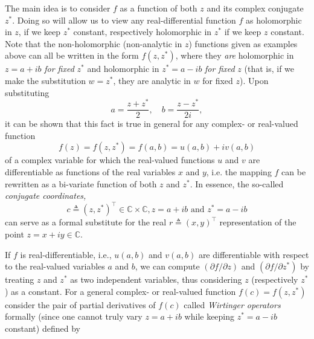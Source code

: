 \documentclass[11pt]{article}
\begin{document}
The main idea is to consider $f$ as a function of both $z$ and its complex conjugate $z^*$. Doing so will allow us to view any real-differential function $f$ as holomorphic in $z$, if we keep $z^* $ constant, respectively holomorphic in $z^*$ if we keep $z$  constant. Note that the non-holomorphic (non-analytic in $z$) functions given as examples above can  all be written in the form $f(z, z^*)$, where they \textit{are} holomorphic in $z=a+ib$ \textit{for fixed} $z^*$ and holomorphic in $z^*= a-ib$ \textit{for fixed} $z$ (that is, if we make the substitution $w=z^*$, they are analytic in $w$ for fixed $z$). Upon substituting
\begin{equation}
a = \frac{z+z^*}{2}, \quad b=\frac{z-z^*}{2i},
\end{equation}
it can be shown that this fact is true in general for any complex- or real-valued function
$$f(z) =f(z, z^*) = f(a,b) = u(a,b) + iv(a,b)$$
of a complex variable for which the real-valued functions $u$ and $v$ are differentiable as functions of the real variables $x$ and $y$, i.e. the mapping $f$ can be rewritten as a bi-variate function of both $z$ and $z^*$. In essence, the so-called \textit{conjugate coordinates,}
\begin{equation}
c \triangleq (z, z^*)^\top\in\mathbb C\times \mathbb C, z=a+ib\text{   and  } z^*= a-ib
\end{equation}
can serve as a formal substitute for the real  $r\triangleq (x,y)^\top$ representation of the point $z=x+iy\in \mathbb C$.

If $f$ is real-differentiable, i.e., $u(a,b)$ and $v(a,b)$ are differentiable with respect to the real-valued variables $a$ and $b$, we can compute $(\partial f/\partial z)$ and $(\partial f/\partial z^*)$ by treating $z$ and $z^*$ as two independent variables, thus considering $z$ (respectively $z^*$) as a constant. For a general complex- or real-valued function $f(c)=f(z,z^*)$ consider the pair of partial derivatives of $f(c)$ called \textit{Wirtinger operators} formally (since one cannot truly vary $z=a+ib$ while keeping $z^*=a-ib$ constant) defined by
\end{document}
